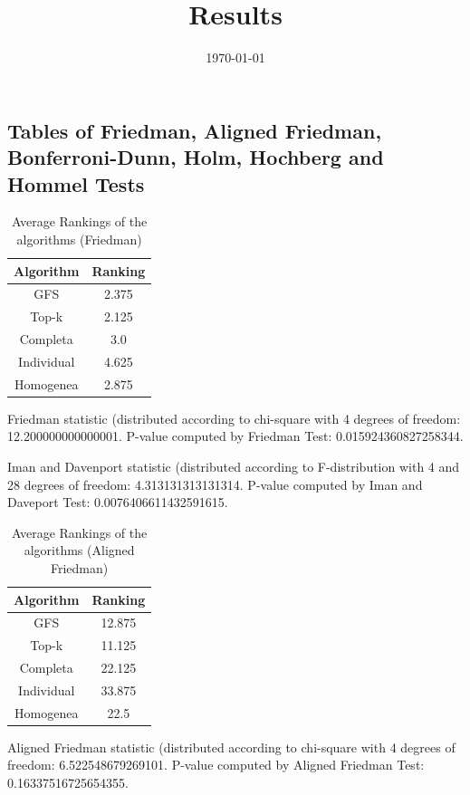 \documentclass[a4paper,10pt]{article}
\title{Results}
\author{}
\date{\today}
\begin{document}
\begin{landscape}
\oddsidemargin 0in \topmargin 0in\maketitle
\section{Tables of Friedman, Aligned Friedman, Bonferroni-Dunn, Holm, Hochberg and Hommel Tests}
\begin{table}[!htp]
\centering
\caption{Average Rankings of the algorithms (Friedman)
}\begin{tabular}{c|c}
Algorithm&Ranking\\
\hline
GFS&2.375\\
Top-k&2.125\\
Completa&3.0\\
Individual&4.625\\
Homogenea&2.875\\
\end{tabular}
\end{table}


Friedman statistic (distributed according to chi-square with 4 degrees of freedom: 12.200000000000001. 
P-value computed by Friedman Test: 0.015924360827258344.\newline

Iman and Davenport statistic (distributed according to F-distribution with 4 and 28 degrees of freedom: 4.313131313131314. 
P-value computed by Iman and Daveport Test: 0.0076406611432591615.\newline


\newpage

\begin{table}[!htp]
\centering
\caption{Average Rankings of the algorithms (Aligned Friedman)
}\begin{tabular}{c|c}
Algorithm&Ranking\\
\hline
GFS&12.875\\
Top-k&11.125\\
Completa&22.125\\
Individual&33.875\\
Homogenea&22.5\\
\end{tabular}
\end{table}


Aligned Friedman statistic (distributed according to chi-square with 4 degrees of freedom: 6.522548679269101. 
P-value computed by Aligned Friedman Test: 0.16337516725654355.\newline



\end{landscape}
\end{document}
